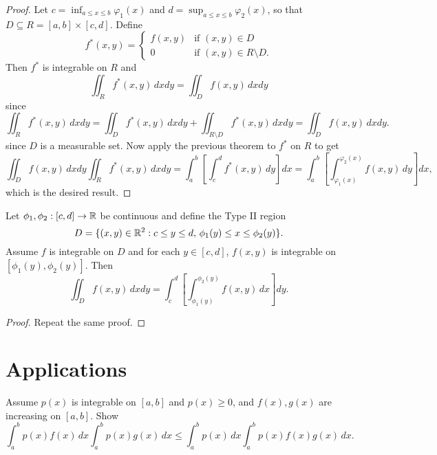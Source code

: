 \begin{proof}
  Let $c = \inf_{a \le x \le b} \varphi_1(x)$ and
  $d = \sup_{a \le x \le b} \varphi_2(x)$, so that
  $D \subseteq R = [a, b] \times [c, d]$. Define
  \[
    f^*(x, y) =
    \begin{cases}
      f(x, y) & \text{if $(x, y) \in D$} \\
      0 & \text{if $(x, y) \in R \setminus D$}.
    \end{cases}
  \]
  Then $f^*$ is integrable on $R$ and
  \[
    \iint_R f^*(x, y)\, dx dy = \iint_D f(x, y)\, dx dy
  \]
  since
  \[
    \iint_R f^*(x, y)\, dx dy = \iint_D f^*(x, y)\, dx dy + \iint_{R \setminus D} f^*(x, y)\, dx dy = \iint_D f(x, y)\, dx dy.
  \]
  since $D$ is a measurable set. Now apply the
  previous theorem to $f^*$ on $R$ to get
  \[
    \iint_D f(x, y)\, dx dy
    \iint_R f^*(x, y)\, dx dy
    = \int_a^b \left[\int_c^d f^*(x, y)\, dy\right] dx
    = \int_a^b \left[\int_{\varphi_1(x)}^{\varphi_2(x)} f(x, y)\, dy\right] dx,
  \]
  which is the desired result.
\end{proof}

\begin{corollary}
  Let $\phi_1, \phi_2 : [c, d] \to \mathbb{R}$ be continuous and
  define the Type II region
  \[
    D = \{(x, y) \in \mathbb{R}^2 : c \le y \le d,\, \phi_1(y) \le x \le \phi_2(y)\}.
  \]
  Assume $f$ is integrable on $D$ and for each
  $y \in [c, d]$, $f(x, y)$ is integrable
  on $[\phi_1(y), \phi_2(y)]$. Then
  \[
    \iint_D f(x, y)\, dx dy = \int_c^d \left[\int_{\phi_1(y)}^{\phi_2(y)} f(x, y)\, dx\right] dy.
  \]
\end{corollary}

\begin{proof}
  Repeat the same proof.
\end{proof}

\section{Applications}
\begin{example}
  Assume $p(x)$ is integrable on $[a, b]$ and
  $p(x) \ge 0$, and $f(x), g(x)$ are increasing
  on $[a, b]$. Show
  \[
    \int_a^b p(x)f(x)\, dx \int_a^b p(x)g(x)\, dx
    \le \int_a^b p(x)\, dx \int_a^b p(x)f(x)g(x)\, dx.
  \]
\end{example}

